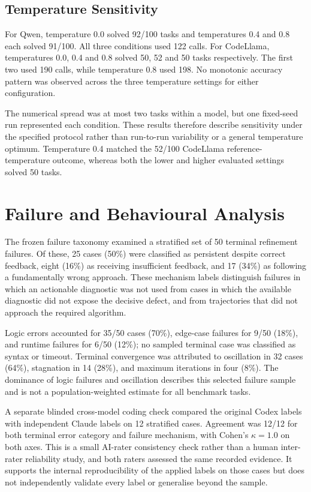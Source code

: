\subsection{Temperature Sensitivity}

For Qwen, temperature 0.0 solved 92/100 tasks and temperatures 0.4 and 0.8 each solved 91/100. All three conditions used 122 calls. For CodeLlama, temperatures 0.0, 0.4 and 0.8 solved 50, 52 and 50 tasks respectively. The first two used 190 calls, while temperature 0.8 used 198. No monotonic accuracy pattern was observed across the three temperature settings for either configuration.

The numerical spread was at most two tasks within a model, but one fixed-seed run represented each condition. These results therefore describe sensitivity under the specified protocol rather than run-to-run variability or a general temperature optimum. Temperature 0.4 matched the 52/100 CodeLlama reference-temperature outcome, whereas both the lower and higher evaluated settings solved 50 tasks.

\section{Failure and Behavioural Analysis}

The frozen failure taxonomy examined a stratified set of 50 terminal refinement failures. Of these, 25 cases (50\%) were classified as persistent despite correct feedback, eight (16\%) as receiving insufficient feedback, and 17 (34\%) as following a fundamentally wrong approach. These mechanism labels distinguish failures in which an actionable diagnostic was not used from cases in which the available diagnostic did not expose the decisive defect, and from trajectories that did not approach the required algorithm.

Logic errors accounted for 35/50 cases (70\%), edge-case failures for 9/50 (18\%), and runtime failures for 6/50 (12\%); no sampled terminal case was classified as syntax or timeout. Terminal convergence was attributed to oscillation in 32 cases (64\%), stagnation in 14 (28\%), and maximum iterations in four (8\%). The dominance of logic failures and oscillation describes this selected failure sample and is not a population-weighted estimate for all benchmark tasks.

A separate blinded cross-model coding check compared the original Codex labels with independent Claude labels on 12 stratified cases. Agreement was 12/12 for both terminal error category and failure mechanism, with Cohen's $\kappa=1.0$ on both axes. This is a small AI-rater consistency check rather than a human inter-rater reliability study, and both raters assessed the same recorded evidence. It supports the internal reproducibility of the applied labels on those cases but does not independently validate every label or generalise beyond the sample.


